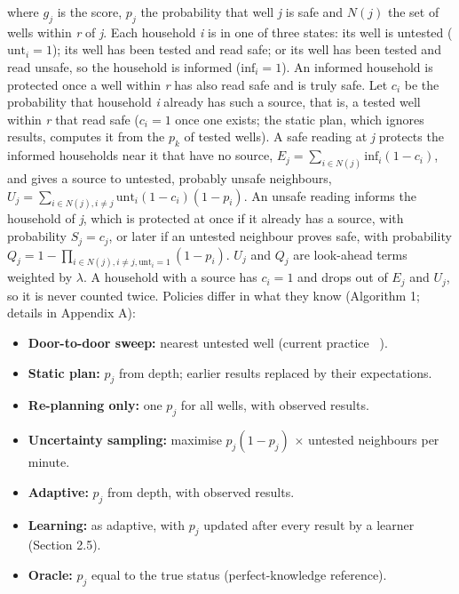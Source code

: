 \documentclass[sustainability,article,submit,pdftex,moreauthors]{Definitions/mdpi}
\begin{document}
where $g_j$ is the score, $p_j$ the probability that well \textit{j} is safe and $N(j)$ the set of wells within \textit{r} of \textit{j}. Each household \textit{i} is in one of three states: its well is untested ($\mathrm{unt}_i = 1$); its well has been tested and read safe; or its well has been tested and read unsafe, so the household is informed ($\mathrm{inf}_i = 1$). An informed household is protected once a well within \textit{r} has also read safe and is truly safe. Let $c_i$ be the probability that household \textit{i} already has such a source, that is, a tested well within \textit{r} that read safe ($c_i = 1$ once one exists; the static plan, which ignores results, computes it from the $p_k$ of tested wells). A safe reading at \textit{j} protects the informed households near it that have no source, $E_j = \sum_{i \in N(j)} \mathrm{inf}_i (1 - c_i)$, and gives a source to untested, probably unsafe neighbours, $U_j = \sum_{i \in N(j), i \neq j} \mathrm{unt}_i (1 - c_i)(1 - p_i)$. An unsafe reading informs the household of \textit{j}, which is protected at once if it already has a source, with probability $S_j = c_j$, or later if an untested neighbour proves safe, with probability $Q_j = 1 - \prod_{i \in N(j), i \neq j, \mathrm{unt}_i = 1} (1 - p_i)$. $U_j$ and $Q_j$ are look-ahead terms weighted by $\lambda$. A household with a source has $c_i = 1$ and drops out of $E_j$ and $U_j$, so it is never counted twice. Policies differ in what they know (Algorithm 1; details in Appendix A):

\begin{itemize}[leftmargin=*,labelsep=5.8mm]
\item \textbf{Door-to-door sweep:} nearest untested well (current practice ~\cite{vanGeen2014}).
\item \textbf{Static plan:} $p_j$ from depth; earlier results replaced by their expectations.
\item \textbf{Re-planning only:} one $p_j$ for all wells, with observed results.
\item \textbf{Uncertainty sampling:} maximise $p_j(1-p_j)$ $\times$ untested neighbours per minute.
\item \textbf{Adaptive:} $p_j$ from depth, with observed results.
\item \textbf{Learning:} as adaptive, with $p_j$ updated after every result by a learner (Section 2.5).
\item \textbf{Oracle:} $p_j$ equal to the true status (perfect-knowledge reference).
\end{itemize}
\end{document}
